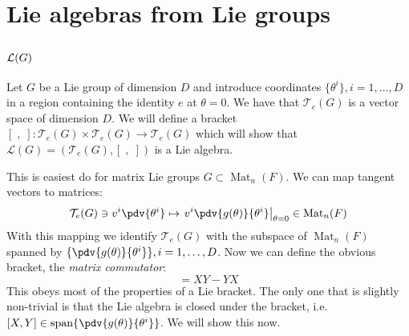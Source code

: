 \documentclass{jknotes}
\begin{document}
\section{Lie algebras from Lie groups}

\subsection{\texorpdfstring{${\cal L}(G)$}{L(G)}}

Let \(G\) be a Lie group of dimension \(D\) and introduce coordinates \(\{\theta^i\},i=1,\ldots,D\) in a region containing the identity \(e\) at \(\theta=0\). We have that \(\mathcal{T}_e(G)\) is a vector space of dimension \(D\). We will define a bracket \([\;,\;]:\mathcal{T}_e(G)\times\mathcal{T}_e(G)\rightarrow\mathcal{T}_e(G)\) which will show that \(\mathcal{L}(G) = (\mathcal{T}_e(G),[\;,\;])\) is a Lie algebra.

This is easiest do for matrix Lie groups \(G \subset \operatorname{Mat}_n(F)\). We can map tangent vectors to matrices:
\begin{equation}
    \mathcal{T}_e(G) \ni v^i\pdv{\theta^i} \mapsto \left.v^i\pdv{g(\theta)}{\theta^i}\right|_{\theta=0} \in \operatorname{Mat}_n(F)
\end{equation}
With this mapping we identify \(\mathcal{T}_e(G)\) with the subspace of \(\operatorname{Mat}_n(F)\) spanned by \(\{\pdv{g(\theta)}{\theta^i}\},i=1,\ldots,D\). Now we can define the obvious bracket, the \emph{matrix commutator}:
\begin{equation}
    [X,Y] = XY-YX
\end{equation}
This obeys most of the properties of a Lie bracket. The only one that is slightly non-trivial is that the Lie algebra is closed under the bracket, i.e. \([X,Y] \in \operatorname{span}\{\pdv{g(\theta)}{\theta^i}\}\). We will show this now.
\end{document}
